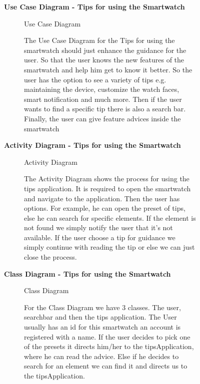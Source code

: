 \documentclass{article}
\begin{document}
	\begin{figure}[htbp]
		\textbf{Use Case Diagram - Tips for using the Smartwatch}
		\centering
		\begin{subfigure}{\textwidth}
			\resizebox{\textwidth}{!}{}
			\caption{Use Case Diagram}
		\end{subfigure}
		\begin{subfigure}{\textwidth}
			The Use Case Diagram for the Tips for using the smartwatch should just enhance the guidance for the user. So that the 
			user knows the new features of the smartwatch and help him get to know it better. So the user has the option to see a 
			variety of tips e.g. maintaining the device, customize the watch faces, smart notification and much more. Then if the user
			wants to find a specific tip there is also a search bar. Finally, the user can give feature advices inside the smartwatch
		\end{subfigure}
	\end{figure}
	\clearpage
	\begin{figure}[htbp]
		\textbf{Activity Diagram - Tips for using the Smartwatch}
		\centering
		\begin{subfigure}{\textwidth}
			\resizebox{\textwidth}{!}{}
			\caption{Activity Diagram}
		\end{subfigure}
		\begin{subfigure}{\textwidth}
			The Activity Diagram shows the process for using the tips application. It is required to open the smartwatch and 
			navigate to the application. Then the user has options. For example, he can open the preset of tips, else he can search
			for specific elements. If the element is not found we simply notify the user that it's not available. 
			If the user choose a tip for guidance we simply continue with reading the tip or else we can just close the process. 
		\end{subfigure}
	\end{figure}
	\clearpage

	\begin{figure}[htbp]
		\textbf{Class Diagram - Tips for using the Smartwatch}
		\centering
		\begin{subfigure}{\textwidth}
			\resizebox{\textwidth}{!}{}
			\caption{Class Diagram}
		\end{subfigure}
		\begin{subfigure}{\textwidth}
			For the Class Diagram we have 3 classes. The user, searchbar and then the tips application. The User usually 
			has an id for this smartwatch an account is registered with a name. If the user decides to pick one of the presets
			it directs him/her to the tipsApplication, where he can read the advice. Else if he decides to search for an element 
			we can find it and directs us to the tipsApplication. 
		\end{subfigure}
	\end{figure}
	\clearpage
\end{document}
